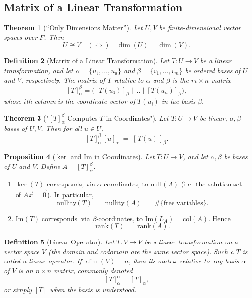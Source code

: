\documentclass[12pt]{article}
\theoremstyle{break}             %
\newtheorem{thm}{Theorem}          %
\newtheorem{prop}[thm]{Proposition}%
\newtheorem{defn}[thm]{Definition}
\begin{document}
\subsection{Matrix of a Linear Transformation}

\begin{thm}[“Only Dimensions Matter”]
Let \(U, V\) be finite-dimensional vector spaces over \(F\). Then 
\[
U \cong V \quad (\Longleftrightarrow)\quad \dim(U) = \dim(V).
\]
\end{thm}

\begin{defn}[Matrix of a Linear Transformation]
Let \(T\colon U\to V\) be a linear transformation, and let 
\(\alpha=\{u_1,\dots,u_n\}\) and \(\beta=\{v_1,\dots,v_m\}\)
be ordered bases of \(U\) and \(V\), respectively.  The \emph{matrix of \(T\) relative to \(\alpha\) and \(\beta\)} is the \(m\times n\) matrix
\[
[T]_{\alpha}^{\beta}
=
\bigl([T(u_1)]_{\beta}\;\big|\;\dots\;\big|\;[T(u_n)]_{\beta}\bigr),
\]
whose \(i\)th column is the coordinate vector of \(T(u_i)\) in the basis \(\beta\).
\end{defn}

\begin{thm}["{\([T]_\alpha^\beta\) Computes \(T\) in Coordinates}"]
Let \(T: U \to V\) be linear, \(\alpha, \beta\) bases of \(U, V\). Then for all \(u \in U\),
\[
[T]_\alpha^\beta \,[u]_\alpha \;=\; [\,T(u)\,]_\beta.
\]
\end{thm}

\begin{prop}[{$\ker$ and $\mathrm{Im}$ in Coordinates}]
Let \(T : U \to V\), and let \(\alpha, \beta\) be bases of \(U\) and \(V\). Define \(A = [T]_{\alpha}^{\beta}\).
\end{prop}

\begin{enumerate}
\item \(\ker(T)\) corresponds, via \(\alpha\)-coordinates, to \(\mathrm{null}(A)\) (i.e.\ the solution set of \(A \vec{x} = \vec{0}\)). In particular, 
\[
\mathrm{nullity}(T) \;=\; \mathrm{nullity}(A) \;=\; \#\{\text{free variables}\}.
\]

\item \(\mathrm{Im}(T)\) corresponds, via \(\beta\)-coordinates, to \(\mathrm{Im}(L_A) = \mathrm{col}(A)\). Hence
\[
\mathrm{rank}(T) \;=\; \mathrm{rank}(A).
\]
\end{enumerate}

\begin{defn}[Linear Operator]
Let \(T\colon V\to V\) be a linear transformation on a vector space \(V\) (the domain and codomain are the same vector space).  Such a \(T\) is called a \emph{linear operator}.  If \(\dim(V)=n\), then its matrix relative to any basis \(\alpha\) of \(V\) is an \(n\times n\) matrix, commonly denoted
\[
[T]_{\alpha}^{\alpha} = [T]_{\alpha},
\]
or simply \([T]\) when the basis is understood.
\end{defn}
\end{document}
